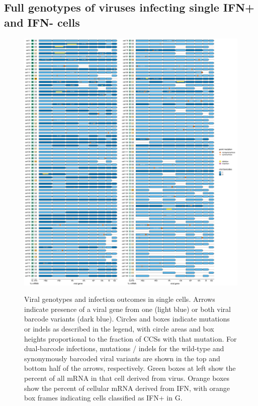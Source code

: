 \documentclass[9pt,lineno]{template}
\begin{document}
\subsection{Full genotypes of viruses infecting single IFN+ and IFN- cells}

\begin{figure}
\begin{fullwidth}
{\centering
\includegraphics[height=0.78\textheight]{figures/single_cell_figures/p_genotypes.pdf}
}
\caption{
Viral genotypes and infection outcomes in single cells.
Arrows indicate presence of a viral gene from one (light blue) or both viral barcode variants (dark blue).
Circles and boxes indicate mutations or indels as described in the legend, with circle areas and box heights proportional to the fraction of CCSs with that mutation.
For dual-barcode infections, mutations / indels for the wild-type and synonymously barcoded viral variants are shown in the top and bottom half of the arrows, respectively. 
Green boxes at left show the percent of all mRNA in that cell derived from virus.
Orange boxes show the percent of cellular mRNA derived from IFN, with orange box frames indicating cells classified as IFN+ in G.
}
\label{fig:genotypes}


\end{fullwidth}
\end{figure}
\end{document}
